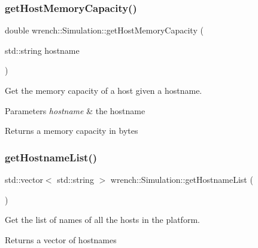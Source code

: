 \subsubsection{\texorpdfstring{get\+Host\+Memory\+Capacity()}{getHostMemoryCapacity()}}
{\footnotesize\ttfamily double wrench\+::\+Simulation\+::get\+Host\+Memory\+Capacity (\begin{DoxyParamCaption}\item[{std\+::string}]{hostname }\end{DoxyParamCaption})\hspace{0.3cm}{\ttfamily [static]}}



Get the memory capacity of a host given a hostname. 


\begin{DoxyParams}{Parameters}
{\em hostname} & the hostname \\
\hline
\end{DoxyParams}
\begin{DoxyReturn}{Returns}
a memory capacity in bytes 
\end{DoxyReturn}
\mbox{\label{classwrench_1_1_simulation_a15b4a28cfb0391525f3dba70317189be}} 
\subsubsection{\texorpdfstring{get\+Hostname\+List()}{getHostnameList()}}
{\footnotesize\ttfamily std\+::vector$<$ std\+::string $>$ wrench\+::\+Simulation\+::get\+Hostname\+List (\begin{DoxyParamCaption}{ }\end{DoxyParamCaption})}



Get the list of names of all the hosts in the platform. 

\begin{DoxyReturn}{Returns}
a vector of hostnames 
\end{DoxyReturn}
\mbox{\label{classwrench_1_1_simulation_a3f4f62572877f3621bac3752839df6a2}} 
